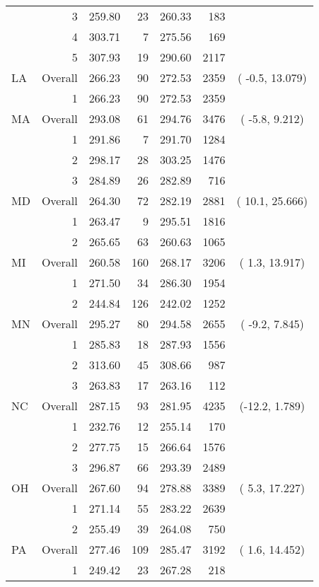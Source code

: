 \begin{longtable}{lrrr@{\extracolsep{.25cm}}rrc}
   & 3 & 259.80 &  23 & 260.33 & 183 &  \\ 
   & 4 & 303.71 &   7 & 275.56 & 169 &  \\ 
   & 5 & 307.93 &  19 & 290.60 & 2117 &  \\ 
   \hline
LA & Overall & 266.23 &  90 & 272.53 & 2359 & ( -0.5, 13.079) \\ 
   & 1 & 266.23 &  90 & 272.53 & 2359 &  \\ 
   \hline
MA & Overall & 293.08 &  61 & 294.76 & 3476 & ( -5.8,  9.212) \\ 
   & 1 & 291.86 &   7 & 291.70 & 1284 &  \\ 
   & 2 & 298.17 &  28 & 303.25 & 1476 &  \\ 
   & 3 & 284.89 &  26 & 282.89 & 716 &  \\ 
   \hline
MD & Overall & 264.30 &  72 & 282.19 & 2881 & ( 10.1, 25.666) \\ 
   & 1 & 263.47 &   9 & 295.51 & 1816 &  \\ 
   & 2 & 265.65 &  63 & 260.63 & 1065 &  \\ 
   \hline
MI & Overall & 260.58 & 160 & 268.17 & 3206 & (  1.3, 13.917) \\ 
   & 1 & 271.50 &  34 & 286.30 & 1954 &  \\ 
   & 2 & 244.84 & 126 & 242.02 & 1252 &  \\ 
   \hline
MN & Overall & 295.27 &  80 & 294.58 & 2655 & ( -9.2,  7.845) \\ 
   & 1 & 285.83 &  18 & 287.93 & 1556 &  \\ 
   & 2 & 313.60 &  45 & 308.66 & 987 &  \\ 
   & 3 & 263.83 &  17 & 263.16 & 112 &  \\ 
   \hline
NC & Overall & 287.15 &  93 & 281.95 & 4235 & (-12.2,  1.789) \\ 
   & 1 & 232.76 &  12 & 255.14 & 170 &  \\ 
   & 2 & 277.75 &  15 & 266.64 & 1576 &  \\ 
   & 3 & 296.87 &  66 & 293.39 & 2489 &  \\ 
   \hline
OH & Overall & 267.60 &  94 & 278.88 & 3389 & (  5.3, 17.227) \\ 
   & 1 & 271.14 &  55 & 283.22 & 2639 &  \\ 
   & 2 & 255.49 &  39 & 264.08 & 750 &  \\ 
   \hline
PA & Overall & 277.46 & 109 & 285.47 & 3192 & (  1.6, 14.452) \\ 
   & 1 & 249.42 &  23 & 267.28 & 218 &  \\ 

\end{longtable}
